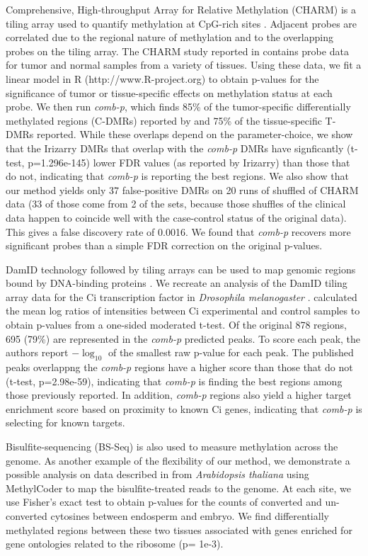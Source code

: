 \documentclass{bioinfo}
\begin{document}
\begin{methods}
Comprehensive, High-throughput Array for Relative Methylation (CHARM)
is a tiling array used to quantify methylation at CpG-rich sites
\citep{Irizarry2008}.  Adjacent probes are correlated
due to the regional nature of methylation and to the overlapping
probes on the tiling array.  The CHARM study reported in
\cite{Irizarry2009} contains probe data for tumor and normal samples
from a variety of tissues. Using these data, we fit a linear model in R
(http://www.R-project.org) to
obtain p-values for the significance of tumor or tissue-specific
effects on methylation status at each probe.  We then run
\textit{comb-p}, which finds 85\% of the tumor-specific differentially
methylated regions (C-DMRs) reported by \cite{Irizarry2009} and 75\% of
the tissue-specific T-DMRs reported.  While these overlaps depend on
the parameter-choice, we show that the Irizarry DMRs that overlap
with the \textit{comb-p} DMRs have signficantly (t-test,
p=1.296e-145) lower FDR values (as reported by Irizarry) than those
that do not, indicating that \textit{comb-p} is reporting the best regions.
We also show that our method yields only 37 false-positive DMRs on 20
runs of shuffled of CHARM data (33 of those come from 2 of the sets,
because those shuffles of the clinical data happen to coincide well
with the case-control status of the original data). This gives a false
discovery rate of 0.0016.
We found that \textit{comb-p} recovers more significant
probes than a simple FDR correction on the original p-values.


DamID technology followed by tiling arrays can be used to map genomic
regions bound by DNA-binding proteins \citep{Steensel2001}.  We
recreate an analysis of the DamID tiling array data for the Ci
transcription factor in {\it Drosophila melanogaster} \citep{Biehs}.
\cite{Kechris2010} calculated the
mean log ratios of intensities between Ci experimental and control
samples to obtain p-values from a one-sided moderated t-test.
Of the original 878 regions, 695 (79\%) are
represented in the \textit{comb-p} predicted peaks.  To score each
peak, the authors report $-\log_{10}$ of the smallest raw p-value for
each peak. The published peaks overlappng the \textit{comb-p} regions
have a higher score than those that do not (t-test, p=2.98e-59),
indicating that \textit{comb-p}
is finding the best regions among those previously reported.
In addition, \textit{comb-p} regions also yield a higher target enrichment
score based on proximity to known Ci genes, indicating that \textit{comb-p}
is selecting for known targets.

Bisulfite-sequencing (BS-Seq) is also used to measure methylation across the
genome. As another example of the flexibility of our method, we demonstrate
a possible analysis on data described in \cite{Hsieh2009} from {\it Arabidopsis
thaliana} using MethylCoder \citep{Pedersen2011} to map the
bisulfite-treated reads to the genome. At each site,
we use Fisher's exact test to obtain p-values for the counts of
converted and un-converted cytosines between endosperm and embryo. We find
differentially methylated regions between these two tissues associated
with genes enriched for gene ontologies related to the ribosome (p=
1e-3).
\end{methods}
\end{document}
